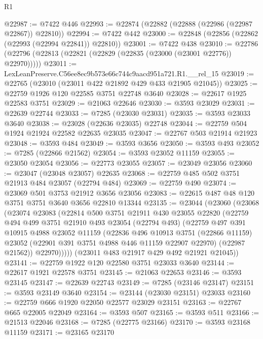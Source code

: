 \begin{lexlean}{R1}
\begin{coremodule}
@22987 := @7422 @446
@22993 := @22874 (@22882 (@22888 (@22986 (@22987 @22867)) @22810))
@22994 := @7422 @442
@23000 := @22848 (@22856 (@22862 (@22993 (@22994 @22841)) @22810))
@23001 := @7422 @438
@23010 := @22786 (@22796 (@22813 (@22821 (@22829 (@22835 (@23000 (@23001 @22776)) @22970)))))
@23011 := LexLeanPreserve.C56ee8ec9b573e66c744c9aacd951a721.R1.__rel_15
@23019 := @22765 (@23010 (@23011 @422 @21892 @429 @433 @21905 @21045))
@23025 := @22759 @1926 @120 @22585 @3751 @22748 @3640
@23028 := @22617 @1925 @22583 @3751
@23029 := @21063 @22646
@23030 := @3593 @23029
@23031 := @22639 @22744
@23033 := @7285 (@23030 @23031)
@23035 := @3593 @23033 @3640
@23038 := @23028 (@22636 @23035) @22748
@23044 := @22759 @504 @1924 @21924 @22582 @22635 @23035
@23047 := @22767 @503 @21914 @21923
@23048 := @3593 @484
@23049 := @3593 @3656
@23050 := @3593 @493
@23052 := @7285 (@22866 @21562)
@23054 := @3593 @23052 @11159
@23055 := @23050 @23054
@23056 := @22773 @23055
@23057 := @23049 @23056
@23060 := @23047 (@23048 @23057) @22635
@23068 := @22759 @485 @502 @3751 @21913 @484 @23057 (@22794 @484)
@23069 := @22759 @490
@23074 := @23069 @501 @3753 @21912 @3656 @23056
@23083 := @22615 @487 @48 @120 @3751 @3751 @3640 @3656 @22810 @13344
@23135 := @23044
    (@23060
      (@23068
        (@23074
          @23083
          (@22814
            @500
            @3751
            @21911
            @430
            @23055
            @22820
            (@22759
              @494
              @499
              @3751
              @21910
              @493
              @23054
              (@22794 @493)
              (@22759
                @497
                @391
                @10915
                @4988
                @23052
                @11159
                (@22836
                  @496
                  @10913
                  @3751
                  (@22866 @11159)
                  @23052
                  (@22901 @391 @3751 @4988 @446 @11159 @22907 @22970)
                  (@22987 @21562))
                @22970)))))
      (@23011 @483 @21917 @429 @492 @21921 @21045))
@23141 := @22759 @1922 @120 @22580 @3751 @23033 @3640
@23144 := @22617 @1921 @22578 @3751
@23145 := @21063 @22653
@23146 := @3593 @23145
@23147 := @22639 @22743
@23149 := @7285 (@23146 @23147)
@23151 := @3593 @23149 @3640
@23154 := @23144 (@23030 @23151) @23033
@23160 := @22759 @666 @1920 @22050 @22577 @23029 @23151
@23163 := @22767 @665 @22005 @22049
@23164 := @3593 @507
@23165 := @3593 @511
@23166 := @21513 @22046
@23168 := @7285 (@22775 @23166)
@23170 := @3593 @23168 @11159
@23171 := @23165 @23170

\end{coremodule}
\end{lexlean}
